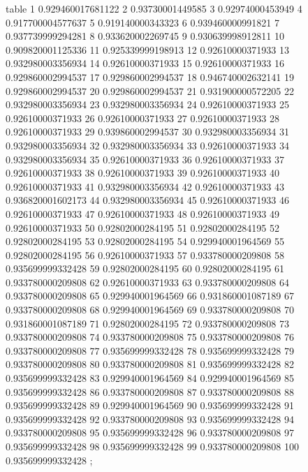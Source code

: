 table {%
	1 0.929460017681122
	2 0.93730001449585
	3 0.92974000453949
	4 0.917700004577637
	5 0.919140000343323
	6 0.939460000991821
	7 0.937739999294281
	8 0.933620002269745
	9 0.930639998912811
	10 0.909820001125336
	11 0.925339999198913
	12 0.92610000371933
	13 0.932980003356934
	14 0.92610000371933
	15 0.92610000371933
	16 0.929860002994537
	17 0.929860002994537
	18 0.946740002632141
	19 0.929860002994537
	20 0.929860002994537
	21 0.931900000572205
	22 0.932980003356934
	23 0.932980003356934
	24 0.92610000371933
	25 0.92610000371933
	26 0.92610000371933
	27 0.92610000371933
	28 0.92610000371933
	29 0.939860002994537
	30 0.932980003356934
	31 0.932980003356934
	32 0.932980003356934
	33 0.92610000371933
	34 0.932980003356934
	35 0.92610000371933
	36 0.92610000371933
	37 0.92610000371933
	38 0.92610000371933
	39 0.92610000371933
	40 0.92610000371933
	41 0.932980003356934
	42 0.92610000371933
	43 0.936820001602173
	44 0.932980003356934
	45 0.92610000371933
	46 0.92610000371933
	47 0.92610000371933
	48 0.92610000371933
	49 0.92610000371933
	50 0.92802000284195
	51 0.92802000284195
	52 0.92802000284195
	53 0.92802000284195
	54 0.929940001964569
	55 0.92802000284195
	56 0.92610000371933
	57 0.933780000209808
	58 0.935699999332428
	59 0.92802000284195
	60 0.92802000284195
	61 0.933780000209808
	62 0.92610000371933
	63 0.933780000209808
	64 0.933780000209808
	65 0.929940001964569
	66 0.931860001087189
	67 0.933780000209808
	68 0.929940001964569
	69 0.933780000209808
	70 0.931860001087189
	71 0.92802000284195
	72 0.933780000209808
	73 0.933780000209808
	74 0.933780000209808
	75 0.933780000209808
	76 0.933780000209808
	77 0.935699999332428
	78 0.935699999332428
	79 0.933780000209808
	80 0.933780000209808
	81 0.935699999332428
	82 0.935699999332428
	83 0.929940001964569
	84 0.929940001964569
	85 0.935699999332428
	86 0.933780000209808
	87 0.933780000209808
	88 0.935699999332428
	89 0.929940001964569
	90 0.935699999332428
	91 0.935699999332428
	92 0.933780000209808
	93 0.935699999332428
	94 0.933780000209808
	95 0.935699999332428
	96 0.933780000209808
	97 0.935699999332428
	98 0.935699999332428
	99 0.933780000209808
	100 0.935699999332428
};
